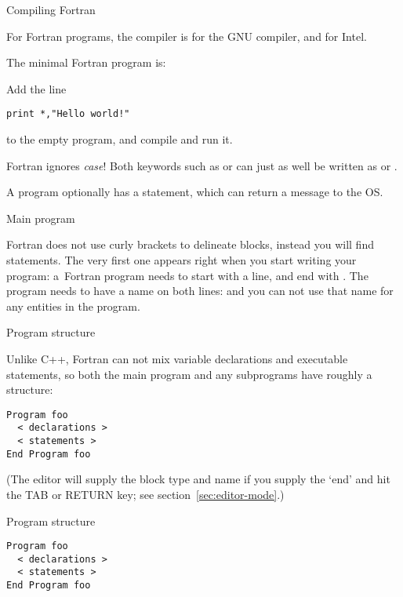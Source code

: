  {Compiling Fortran}

For Fortran programs, the compiler is  for the
GNU compiler, and  for Intel.

The minimal Fortran program is:
%

\begin{exercise}
  Add the line
\begin{verbatim}
print *,"Hello world!"
\end{verbatim}
to the empty program, and compile and run it.
\end{exercise}

Fortran ignores \emph{case}!
Both keywords such as  or  can just as well be written as
 or .

A program optionally has a  statement, which can
return a message to the \ac{OS}.
%

 {Main program}

Fortran does not use curly brackets to delineate blocks, instead you
will find  statements. The very first one appears
right when you start writing your program:
a~Fortran program needs to start with a  line, and end with
. The program needs to have a name on both lines:
%
%
and you can not use that name for any entities in the program.

 {Program structure}

Unlike C++, Fortran can not mix variable declarations and executable
statements, so both the main program and any subprograms have roughly
a
structure:
\begin{verbatim}
Program foo
  < declarations >
  < statements >
End Program foo
\end{verbatim}
(The  editor will supply the block type and name if
you supply the `end' and hit the TAB or RETURN key; see
section~\ref{sec:editor-mode}.)

\begin{slide}{Program structure}
  \label{sl:programf}
\begin{verbatim}
Program foo
  < declarations >
  < statements >
End Program foo
\end{verbatim}
\end{slide}

